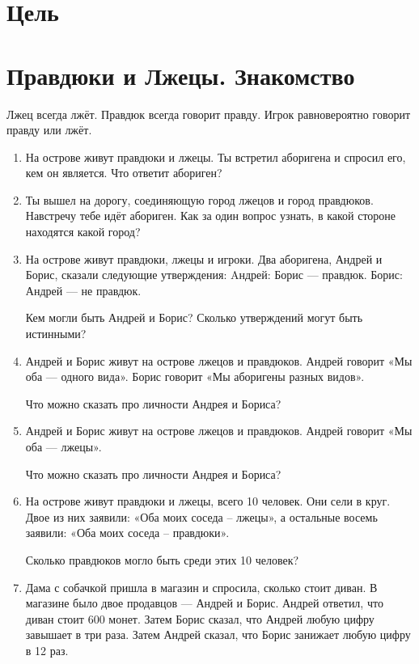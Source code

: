\documentclass[12pt]{article}
\theoremstyle{definition}
\begin{document}
\tableofcontents{}

\section*{Цель}




\newpage
\section{Правдюки и Лжецы. Знакомство}

Лжец всегда лжёт. Правдюк всегда говорит правду. Игрок равновероятно говорит правду или лжёт. 

\begin{enumerate}
  \item На острове живут правдюки и лжецы. 
  Ты встретил аборигена и спросил его, кем он является. Что ответит абориген? 
  
  \item Ты вышел на дорогу, соединяющую город лжецов и город правдюков. Навстречу тебе идёт абориген. 
  Как за один вопрос узнать, в какой стороне находятся какой город?
  
  \item На острове живут правдюки, лжецы и игроки. Два аборигена, Андрей и Борис, сказали следующие утверждения:
  Aндрей: Борис — правдюк.
  Борис: Андрей — не правдюк.

  Кем могли быть Андрей и Борис? Сколько утверждений могут быть истинными?


  \item Андрей и Борис живут на острове лжецов и правдюков. Андрей говорит «Мы оба — одного вида». 
  Борис говорит «Мы аборигены разных видов».
  
  Что можно сказать про личности Андрея и Бориса?

  \item Андрей и Борис живут на острове лжецов и правдюков. Андрей говорит «Мы оба — лжецы». 
  
  Что можно сказать про личности Андрея и Бориса?


  \item На острове живут правдюки и лжецы, всего 10 человек. Они сели в круг. 
  Двое из них заявили: «Оба моих соседа – лжецы», а остальные восемь заявили: «Оба моих соседа – правдюки». 
  
  Сколько правдюков могло быть среди этих 10 человек? 


  \item Дама с собачкой пришла в магазин и спросила, сколько стоит диван. 
  В магазине было двое продавцов — Андрей и Борис. Андрей ответил, что диван стоит 600 монет.
  Затем Борис сказал, что Андрей любую цифру завышает в три раза.
  Затем Андрей сказал, что Борис занижает любую цифру в 12 раз.


\end{enumerate}
\end{document}
